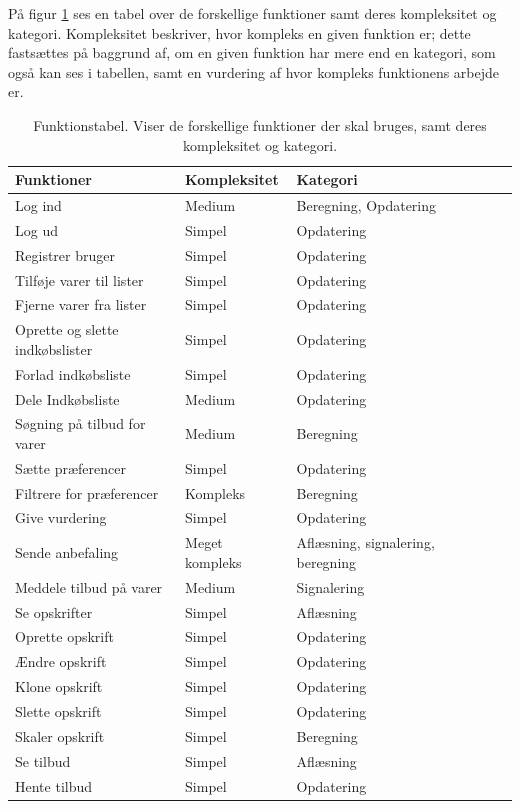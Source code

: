 På figur \ref{tabel:functionstable} ses en tabel over de forskellige funktioner samt deres kompleksitet og kategori.
Kompleksitet beskriver, hvor kompleks en given funktion er; dette fastsættes på baggrund af, om en given funktion har mere end en kategori, som også kan ses i tabellen, samt en vurdering af hvor kompleks funktionens arbejde er.

\begin{table}[H]
  \centering
      \begin{tabular}{l|lllll}
      \textbf{Funktioner}			& {Kompleksitet}	& {Kategori}  	\\ \hline
      Log ind						& Medium			& Beregning, Opdatering		\\
      Log ud						    & Simpel			& Opdatering	\\
      Registrer bruger				& Simpel			& Opdatering	\\
      Tilføje varer til lister		& Simpel       & Opdatering	\\
      Fjerne varer fra lister		& Simpel       		& Opdatering	\\
      Oprette og slette indkøbslister & Simpel       	& Opdatering	\\
      Forlad indkøbsliste			& Simpel			& Opdatering \\
      Dele Indkøbsliste				& Medium       		& Opdatering	\\
      Søgning på tilbud for varer    & Medium     		& Beregning		\\
      Sætte præferencer				& Simpel       		& Opdatering	\\
      Filtrere for præferencer		& Kompleks     		& Beregning		\\
      Give vurdering				& Simpel       		& Opdatering	\\
      Sende anbefaling				& Meget kompleks	& Aflæsning, signalering, beregning		\\
      Meddele tilbud på varer		& Medium      		& Signalering	\\
	  Se opskrifter					& Simpel       		& Aflæsning		\\
      Oprette opskrift      		& Simpel            & Opdatering  	\\
      Ændre opskrift        		& Simpel            & Opdatering	\\
      Klone	opskrift       			& Simpel            & Opdatering 	\\
      Slette opskrift				& Simpel			& Opdatering	\\
      Skaler opskrift				& Simpel			& Beregning		\\
	  Se tilbud						& Simpel       		& Aflæsning		\\
      Hente tilbud					& Simpel	       	& Opdatering	\\
    \end{tabular}
  \caption{Funktionstabel. Viser de forskellige funktioner der skal bruges, samt deres kompleksitet og kategori.}\label{tabel:functionstable}
\end{table}

